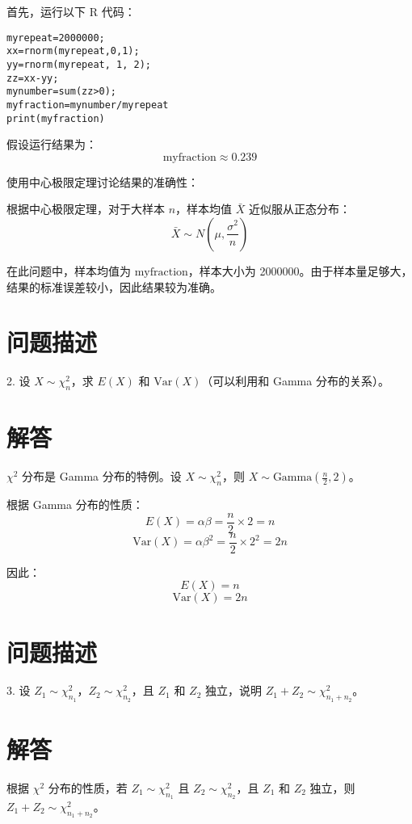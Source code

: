 \documentclass[UTF8]{report}
\theoremstyle{MyLineTheoremStyle} %
\theoremstyle{MyBlockTheoremStyle} %
\theoremstyle{MySubsubsectionStyle} %
\begin{document}
首先，运行以下 R 代码：

\begin{verbatim}
myrepeat=2000000;
xx=rnorm(myrepeat,0,1);
yy=rnorm(myrepeat, 1, 2);
zz=xx-yy;
mynumber=sum(zz>0);
myfraction=mynumber/myrepeat
print(myfraction)
\end{verbatim}

假设运行结果为：
\[
\text{myfraction} \approx 0.239
\]

使用中心极限定理讨论结果的准确性：

根据中心极限定理，对于大样本 \(n\)，样本均值 \(\bar{X}\) 近似服从正态分布：
\[
\bar{X} \sim N\left(\mu, \frac{\sigma^2}{n}\right)
\]

在此问题中，样本均值为 \(\text{myfraction}\)，样本大小为 2000000。由于样本量足够大，结果的标准误差较小，因此结果较为准确。

\section{问题描述}

2. 设 \(X \sim \chi^2_n\)，求 \(E(X)\) 和 \(\text{Var}(X)\)（可以利用和 Gamma 分布的关系）。

\section{解答}

\(\chi^2\) 分布是 Gamma 分布的特例。设 \(X \sim \chi^2_n\)，则 \(X \sim \text{Gamma}\left(\frac{n}{2}, 2\right)\)。

根据 Gamma 分布的性质：
\[
E(X) = \alpha \beta = \frac{n}{2} \times 2 = n
\]
\[
\text{Var}(X) = \alpha \beta^2 = \frac{n}{2} \times 2^2 = 2n
\]

因此：
\[
E(X) = n
\]
\[
\text{Var}(X) = 2n
\]

\section{问题描述}

3. 设 \(Z_1 \sim \chi^2_{n_1}\)，\(Z_2 \sim \chi^2_{n_2}\)，且 \(Z_1\) 和 \(Z_2\) 独立，说明 \(Z_1 + Z_2 \sim \chi^2_{n_1 + n_2}\)。

\section{解答}

根据 \(\chi^2\) 分布的性质，若 \(Z_1 \sim \chi^2_{n_1}\) 且 \(Z_2 \sim \chi^2_{n_2}\)，且 \(Z_1\) 和 \(Z_2\) 独立，则 \(Z_1 + Z_2 \sim \chi^2_{n_1 + n_2}\)。
\end{document}
